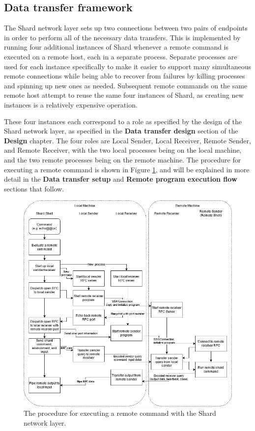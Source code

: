 \documentclass[oneside]{report}
\begin{document}
\subsection{Data transfer framework}

The Shard network layer sets up two connections between two pairs of endpoints in order to perform all of the necessary data transfers.
This is implemented by running four additional instances of Shard whenever a remote command is executed on a remote host, each in a separate process.
Separate processes are used for each instance specifically to make it easier to support many simultaneous remote connections while being able to recover from failures by killing processes and spinning up new ones as needed.
Subsequent remote commands on the same remote host attempt to reuse the same four instances of Shard, as creating new instances is a relatively expensive operation.

These four instances each correspond to a role as specified by the design of the Shard network layer, as specified in the \textbf{Data transfer design} section of the \textbf{Design} chapter.
The four roles are Local Sender, Local Receiver, Remote Sender, and Remote Receiver, with the two local processes being on the local machine, and the two remote processes being on the remote machine.
The procedure for executing a remote command is shown in Figure \ref{fig:network_layer_impl}, and will be explained in more detail in the \textbf{Data transfer setup} and \textbf{Remote program execution flow} sections that follow.

\begin{figure}[h]
  \begin{center}
    \includegraphics[scale=0.49]{img/shard_protocol_impl.png}
    \caption{The procedure for executing a remote command with the Shard network layer.}
    \label{fig:network_layer_impl}
  \end{center}
\end{figure}
\end{document}
